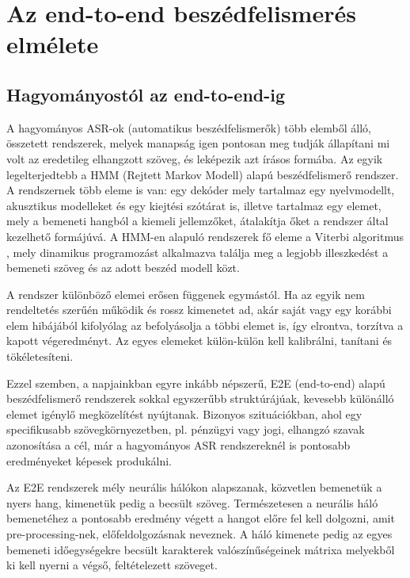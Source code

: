 \chapter{Az end-to-end beszédfelismerés elmélete}

\section{Hagyományostól az end-to-end-ig}

A hagyományos ASR-ok (automatikus beszédfelismerők) több elemből álló, összetett rendszerek, melyek manapság igen pontosan meg tudják állapítani mi volt az eredetileg elhangzott szöveg, és leképezik azt írásos formába. Az egyik legelterjedtebb a HMM (Rejtett Markov Modell) alapú beszédfelismerő rendszer. A rendszernek több eleme is van: egy dekóder mely tartalmaz egy nyelvmodellt, akusztikus modelleket és egy kiejtési szótárat is, illetve tartalmaz egy elemet, mely a bemeneti hangból a kiemeli jellemzőket, átalakítja őket a rendszer által kezelhető formájúvá. A HMM-en alapuló rendszerek fő eleme a Viterbi algoritmus \cite{viterbi}, mely dinamikus programozást alkalmazva találja meg a legjobb illeszkedést a bemeneti szöveg és az adott beszéd modell közt.

A rendszer különböző elemei erősen függenek egymástól. Ha az egyik nem rendeltetés szerűén működik és rossz kimenetet ad, akár saját vagy egy korábbi elem hibájából kifolyólag az befolyásolja a többi elemet is, így elrontva, torzítva a kapott végeredményt. Az egyes elemeket külön-külön kell kalibrálni, tanítani és tökéletesíteni.

Ezzel szemben, a napjainkban egyre inkább népszerű, E2E (end-to-end) alapú beszédfelismerő rendszerek sokkal egyszerűbb struktúrájúak, kevesebb különálló elemet igénylő megközelítést nyújtanak. Bizonyos szituációkban, ahol egy specifikusabb szövegkörnyezetben, pl. pénzügyi vagy jogi, elhangzó szavak azonosítása a cél, már a hagyományos ASR rendszereknél is pontosabb eredményeket képesek produkálni.

Az E2E rendszerek mély neurális hálókon alapszanak, közvetlen bemenetük a nyers hang, kimenetük pedig a becsült szöveg. Természetesen a neurális háló bemenetéhez a pontosabb eredmény végett a hangot előre fel kell dolgozni, amit pre-processing-nek, előfeldolgozásnak neveznek. A háló kimenete pedig az egyes bemeneti időegységekre becsült karakterek valószínűségeinek mátrixa melyekből ki kell nyerni a végső, feltételezett szöveget.

